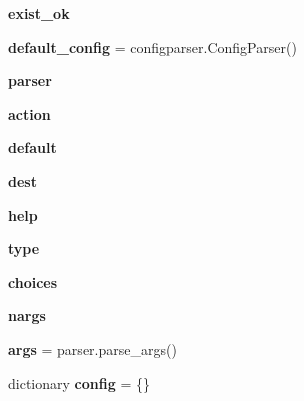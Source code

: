 \begin{DoxyCompactItemize}
\item 
\mbox{\label{namespaceharness_1_1config_a7601413f946e4311c25f562657ca6e7b}} 
{\bfseries exist\+\_\+ok}
\item 
\mbox{\label{namespaceharness_1_1config_a3dc585f9bfbb87b24b9152007ab2df28}} 
{\bfseries default\+\_\+config} = configparser.\+Config\+Parser()
\item 
{\bfseries parser}
\item 
\mbox{\label{namespaceharness_1_1config_a3944900714407974f0a75076d2edd0eb}} 
{\bfseries action}
\item 
\mbox{\label{namespaceharness_1_1config_a7c2c6674f38503bb2e7920756d8cc6f3}} 
{\bfseries default}
\item 
\mbox{\label{namespaceharness_1_1config_a87594e4327e0623df199ee96b01873b9}} 
{\bfseries dest}
\item 
\mbox{\label{namespaceharness_1_1config_af7679185644bceeba0a7e81c9c285342}} 
{\bfseries help}
\item 
\mbox{\label{namespaceharness_1_1config_a8f53ab7ef4e3a2a1cf6386aead3b6ad7}} 
{\bfseries type}
\item 
\mbox{\label{namespaceharness_1_1config_a9cb5cefbc1da1a19014c09197dd130e9}} 
{\bfseries choices}
\item 
\mbox{\label{namespaceharness_1_1config_a8bc2813fcde3ce0c480b403dfac2f683}} 
{\bfseries nargs}
\item 
\mbox{\label{namespaceharness_1_1config_a293527a30287dbbd2fa9edd19bca6e3f}} 
{\bfseries args} = parser.\+parse\+\_\+args()
\item 
\mbox{\label{namespaceharness_1_1config_ac5daf00fe9eb8113735f13bb58a59624}} 
dictionary {\bfseries config} = \{\}
\end{DoxyCompactItemize}


